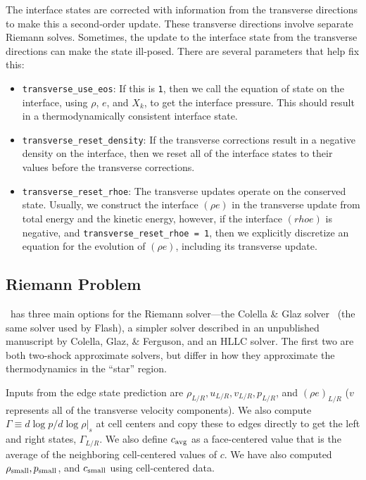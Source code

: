 The interface states are corrected with information from the
transverse directions to make this a second-order update.  These
transverse directions involve separate Riemann solves.  Sometimes, the
update to the interface state from the transverse directions can make
the state ill-posed.  There are several parameters that help fix this:
\begin{itemize}
  \item {\tt transverse\_use\_eos}: If this is {\tt 1}, then we call
    the equation of state on the interface, using $\rho$, $e$, and
    $X_k$, to get the interface pressure.  This should result in a
    thermodynamically consistent interface state.

  \item {\tt transverse\_reset\_density}: If the transverse
    corrections result in a negative density on the interface, then we
    reset all of the interface states to their values before the
    transverse corrections.

  \item {\tt transverse\_reset\_rhoe}: The transverse updates operate
    on the conserved state.  Usually, we construct the interface
    $(\rho e)$ in the transverse update from total energy and the
    kinetic energy, however, if the interface $(rho e)$ is negative,
    and {\tt transverse\_reset\_rhoe = 1}, then we explicitly
    discretize an equation for the evolution of $(\rho e)$, including
    its transverse update.
\end{itemize}





\subsection{Riemann Problem}

\castro\ has three main options for the Riemann solver---the
Colella \& Glaz solver~\cite{colglaz} (the same solver used
by Flash), a simpler solver described in an unpublished
manuscript by Colella, Glaz, \& Ferguson, and an HLLC
solver.  The first two are both
two-shock approximate solvers, but differ in how they approximate
the thermodynamics in the ``star'' region.  

Inputs from the edge state prediction are $\rho_{L/R}, u_{L/R},
v_{L/R}, p_{L/R}$, and $(\rho e)_{L/R}$ ($v$ represents all of the
transverse velocity components).  We also compute $\Gamma \equiv d\log
p / d\log \rho |_s$ at cell centers and copy these to edges directly
to get the left and right states, $\Gamma_{L/R}$.  We also define
$c_{\rm avg}$ as a face-centered value that is the average of the
neighboring cell-centered values of $c$.  We have also computed
$\rho_{\rm small}, p_{\rm small}$, and $c_{\rm small}$ using
cell-centered data.

